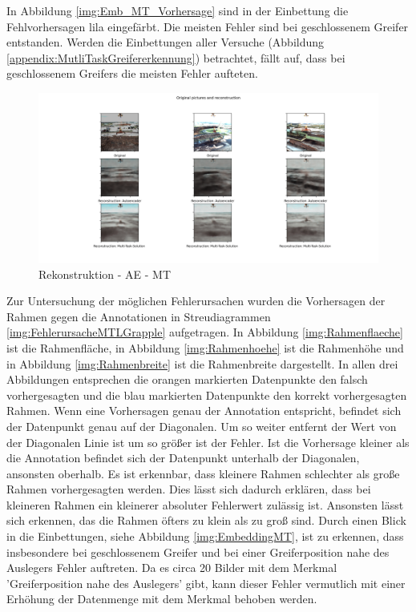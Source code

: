 	In Abbildung \ref{img:Emb_MT_Vorhersage} sind in der Einbettung die Fehlvorhersagen lila eingefärbt. Die meisten Fehler sind bei geschlossenem Greifer entstanden. Werden die Einbettungen aller Versuche (Abbildung \ref{appendix:MutliTaskGreifererkennung}) betrachtet, fällt auf, dass bei geschlossenem Greifers die meisten Fehler aufteten.
	\begin{figure}[h]
		\centering
		\includegraphics[width=1\textwidth, center]{bilder/Hauptteil/MT_Grapple/OriginalPicturesandReconstruction.png}
		\caption{Rekonstruktion - AE - MT}
		\label{img:RekonstruktionMTAE}
	\end{figure}  	
	Zur Untersuchung der möglichen Fehlerursachen wurden die Vorhersagen der Rahmen gegen die Annotationen in Streudiagrammen \ref{img:FehlerursacheMTLGrapple} aufgetragen. In Abbildung \ref{img:Rahmenflaeche} ist die Rahmenfläche, in Abbildung \ref{img:Rahmenhoehe} ist die Rahmenhöhe und in Abbildung \ref{img:Rahmenbreite} ist die Rahmenbreite dargestellt. In allen drei Abbildungen entsprechen die orangen markierten Datenpunkte den falsch vorhergesagten und die blau markierten Datenpunkte den korrekt vorhergesagten Rahmen. Wenn eine Vorhersagen genau der Annotation entspricht, befindet sich der Datenpunkt genau auf der Diagonalen. Um so weiter entfernt der Wert von der Diagonalen Linie ist um so größer ist der Fehler. Ist die Vorhersage kleiner als die Annotation befindet sich der Datenpunkt unterhalb der Diagonalen, ansonsten oberhalb. Es ist erkennbar, dass kleinere Rahmen schlechter als große Rahmen vorhergesagten werden. Dies lässt sich dadurch erklären, dass bei kleineren Rahmen ein kleinerer absoluter Fehlerwert zulässig ist. Ansonsten lässt sich erkennen, das die Rahmen öfters zu klein als zu groß sind. Durch einen Blick in die Einbettungen, siehe Abbildung \ref{img:EmbeddingMT}, ist zu erkennen, dass insbesondere bei geschlossenem Greifer und bei einer Greiferposition nahe des Auslegers Fehler auftreten. Da es circa 20 Bilder mit dem Merkmal 'Greiferposition nahe des Auslegers' gibt, kann dieser Fehler vermutlich mit einer Erhöhung der Datenmenge mit dem Merkmal behoben werden. 
